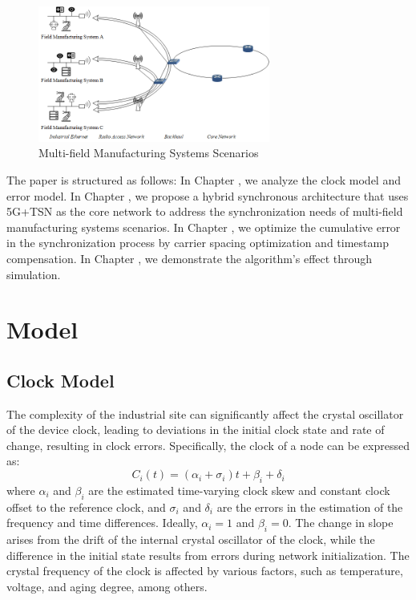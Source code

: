 \documentclass[english]{cccconf}
\begin{document}
{\begin{itemize}
\end{itemize}
\begin{figure}[htbp]
	\centering
	\setcounter{figure}{0}
	\includegraphics[width=3in]{fig11.png}
	\caption{Multi-field Manufacturing Systems Scenarios}
\end{figure}

The paper is structured as follows: In Chapter \uppercase\expandafter{}, we analyze the clock model and error model. In Chapter \uppercase\expandafter{}, we propose a hybrid synchronous architecture that uses 5G+TSN as the core network to address the synchronization needs of multi-field manufacturing systems scenarios. In Chapter \uppercase\expandafter{}, we optimize the cumulative error in the synchronization process by carrier spacing optimization and timestamp compensation. In Chapter \uppercase\expandafter{}, we demonstrate the algorithm's effect through simulation.

\section{Model}

\subsection{Clock Model}
The complexity of the industrial site can significantly affect the crystal oscillator of the device clock, leading to deviations in the initial clock state and rate of change, resulting in clock errors. Specifically, the clock of a node can be expressed as:
\begin{equation}
	C_i(t) = (\alpha _i+\sigma_i)t + \beta _i +\delta_i
\end{equation}
where $\alpha_i$ and $\beta_i$ are the estimated time-varying clock skew and constant clock offset to the reference clock, and $\sigma_i$ and $\delta_i$ are the errors in the estimation of the frequency and time differences. Ideally, $\alpha_i = 1$ and $\beta_i = 0$. The change in slope arises from the drift of the internal crystal oscillator of the clock, while the difference in the initial state results from errors during network initialization. The crystal frequency of the clock is affected by various factors, such as temperature, voltage, and aging degree, among others.

}
\end{document}
